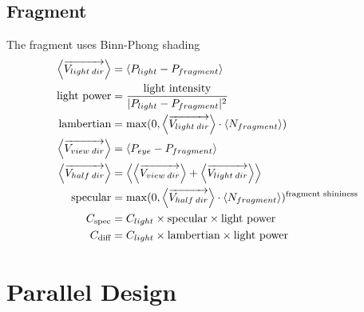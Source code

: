 \documentclass[12pt]{article}
\begin{document}
\subsection{Fragment}
The fragment uses Binn-Phong shading 
\begin{gather*}\begin{aligned}
		\left\langle \overrightarrow{V_{light\hspace{0.2em}dir}} \right\rangle
		&=
		\left\langle P_{light}-P_{fragment}\right\rangle \notag\\
		\text{light power} 
		&= 
		\frac{\text{light intensity}}{| P_{light}-P_{fragment}|^2}\\
		\text{lambertian} 
		&= \max(0, \left\langle 
		\overrightarrow{V_{light\hspace{0.2em}dir}} \right\rangle \cdot   \left\langle N_{fragment}\right\rangle) \\
		\left\langle\overrightarrow{V_{view\hspace{0.2em}dir}} \right\rangle 
		&= 
		\left\langle P_{eye}-P_{fragment}\right\rangle\\
		\left\langle\overrightarrow{V_{half\hspace{0.2em}dir}} \right\rangle 
		&= 
		\left\langle 
		\left\langle\overrightarrow{V_{view\hspace{0.2em}dir}} \right\rangle
		+
		\left\langle \overrightarrow{V_{light\hspace{0.2em}dir}}  \right\rangle
		\right\rangle \\
		\text{specular} &= \max(0, 
		\left\langle\overrightarrow{V_{half\hspace{0.2em}dir}} \right\rangle
		\cdot
		\left\langle N_{fragment}\right\rangle			
		)^{\text{fragment shininess}}\\
		C_{\text{spec}} &= C_{light}\times \text{specular} \times \text{light power}\\
		C_{\text{diff}} &= C_{light}\times \text{lambertian} \times \text{light power}
\end{aligned}\end{gather*}

\section{Parallel Design}

\end{document}
